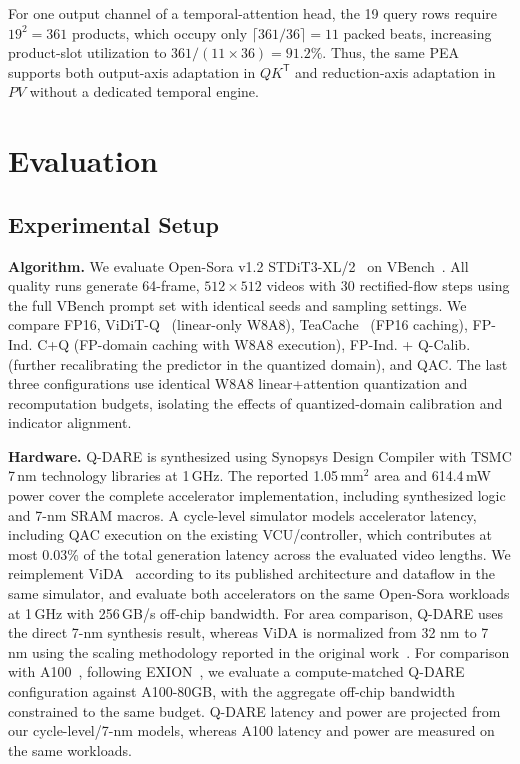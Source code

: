 \documentclass[conference]{IEEEtran}
\begin{document}
For one output channel of a temporal-attention head, the 19 query rows require $19^2=361$ products, which occupy only
$\lceil361/36\rceil=11$ packed beats, increasing product-slot
utilization to $361/(11\times36)=91.2\%$.
Thus, the same PEA supports both output-axis adaptation in
$QK^{\mathsf T}$ and reduction-axis adaptation in $PV$ without a
dedicated temporal engine.
\section{Evaluation}
\label{sec:eval}

\subsection{Experimental Setup}
\textbf{Algorithm.}
We evaluate Open-Sora v1.2 STDiT3-XL/2~\cite{zheng2024opensora} on VBench~\cite{huang2024vbench}. All quality runs generate 64-frame, $512\times512$ videos with 30 rectified-flow steps using the full VBench prompt set with identical seeds and sampling settings. We compare FP16, ViDiT-Q~\cite{zhao2025viditq} (linear-only W8A8),
TeaCache~\cite{liu2025teacache} (FP16 caching), FP-Ind. C+Q (FP-domain caching with W8A8 execution), FP-Ind. + Q-Calib. (further recalibrating the predictor in the quantized domain), and QAC. The last three configurations use identical W8A8 linear+attention quantization and recomputation budgets, isolating the effects of quantized-domain calibration and indicator alignment.



\textbf{Hardware.}
Q-DARE is synthesized using Synopsys Design Compiler with
TSMC 7\,nm technology libraries at 1\,GHz.
The reported 1.05\,mm$^2$ area and 614.4\,mW power cover the complete accelerator implementation,
including synthesized logic and 7-nm SRAM
macros. A cycle-level simulator models accelerator latency, including
QAC execution on the existing VCU/controller, which contributes
at most 0.03\% of the total generation latency across the
evaluated video lengths. We reimplement ViDA~\cite{ding2025vida} according to its published architecture and dataflow in the same simulator, and evaluate both accelerators on the same Open-Sora workloads at 1\,GHz with 256\,GB/s off-chip bandwidth. For area comparison,
Q-DARE uses the direct 7-nm synthesis result, whereas ViDA
is normalized from 32 nm to 7 nm using the scaling methodology
reported in the original work~\cite{ding2025vida}. For comparison with A100~\cite{nvidiaA100}, following EXION~\cite{heo2025exion}, we evaluate a compute-matched Q-DARE configuration against A100-80GB, with the aggregate off-chip bandwidth constrained to the same budget. Q-DARE latency and power are projected from our cycle-level/7-nm models, whereas A100 latency and power are measured on the same workloads.
\end{document}
